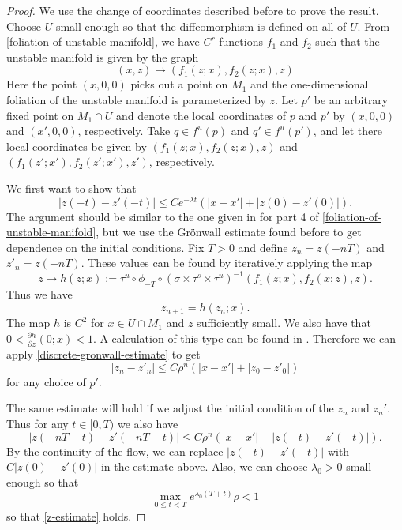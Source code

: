 \begin{proof}
	We use the change of coordinates described before to prove the result. Choose \(U\) small enough so that the diffeomorphism is defined on all of \(U\). From \cref{foliation-of-unstable-manifold}, we have \(C^r\) functions \(f_1\) and \(f_2\) such that the unstable manifold is given by the graph
	\begin{equation}
		(x,z) \mapsto (f_1(z; x),  f_2(z;x),  z)
	\end{equation}
	Here the point \((x,0,0)\) picks out a point on \( M_1\) and the one-dimensional foliation of the unstable manifold is parameterized by \(z\).
	Let \(p'\) be an arbitrary fixed point on \( M_1\cap U\) and denote the local coordinates of \(p\) and \(p'\) by \((x,0,0)\) and \((x',0,0)\), respectively. Take \(q \in f^u(p)\) and \(q' \in f^u(p')\), and let there local coordinates be given by \((f_1(z;x), f_2(z; x), z)\) and \((f_1(z';x') , f_2(z';x'), z')\), respectively. 
	
	We first want to show that 
	\begin{equation}\label{z-estimate}
		|z(-t) - z'(-t)| \leq C e^{-\lambda t} (|x- x'| + |z(0) - z'(0)|).
	\end{equation}
	The argument should be similar to the one given in \cite{wiggins1994normally} for part 4 of \cref{foliation-of-unstable-manifold}, but we use the Gr\"onwall estimate found before to get dependence on the initial conditions. Fix \(T>0\) and define \(z_n = z(-nT)\) and \(z'_{n} = z(-nT)\). These values can be found by iteratively applying the map
	\begin{equation}
		z \mapsto h(z;x) := \tau^u \circ \phi_{-T} \circ (\sigma \times \tau^s \times \tau^u)^{-1}(f_1(z;x), f_2(x;z), z).
	\end{equation}
	Thus we have 
	\begin{equation}
		z_{n+1} = h(z_{n}; x).
	\end{equation}
	The map \(h\) is \(C^2\) for \(x\in \overline {U\cap M_1}\) and \(z\) sufficiently small. We also have that \(0 < \frac{\partial h}{\partial z}(0;x) < 1\). A calculation of this type can be found in \cite{wiggins1994normally}. Therefore we can apply \cref{discrete-gronwall-estimate} to get 
	\begin{equation}
		|z_n - z'_n| \leq C \rho^n (|x-x'| + |z_0 - z'_0|)
	\end{equation}
	for any choice of \(p'\).
	
	The same estimate will hold if we adjust the initial condition of the \(z_n\) and \(z_n'\). Thus for any \(t\in [0,T)\) we also have
	\begin{equation}
		|z(-nT - t) - z'(-nT - t)| \leq C \rho^n (|x-x'| + |z(-t) - z'(-t)|).
	\end{equation}
	By the continuity of the flow, we can replace \(|z(-t) - z'(-t)|\) with \(C|z(0) - z'(0)|\) in the estimate above. Also, we can choose \(\lambda_0 > 0\) small enough so that
	\begin{equation}
		\max_{0\leq t < T} e^{\lambda_0 (T + t)} \rho < 1
	\end{equation}
	so that \cref{z-estimate} holds.
	

\end{proof}
